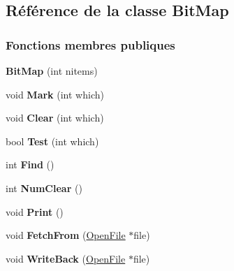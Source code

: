 \hypertarget{class_bit_map}{}\subsection{Référence de la classe Bit\+Map}
\label{class_bit_map}
\subsubsection*{Fonctions membres publiques}
\begin{DoxyCompactItemize}
\item 
\hypertarget{class_bit_map_a957cdc72d04ce006b2efce59caa90379}{}\label{class_bit_map_a957cdc72d04ce006b2efce59caa90379} 
{\bfseries Bit\+Map} (int nitems)
\item 
\hypertarget{class_bit_map_ae3eb006c755440ae830bf220457dbbc7}{}\label{class_bit_map_ae3eb006c755440ae830bf220457dbbc7} 
void {\bfseries Mark} (int which)
\item 
\hypertarget{class_bit_map_aee4445b4d2079c96f5c87896717569d2}{}\label{class_bit_map_aee4445b4d2079c96f5c87896717569d2} 
void {\bfseries Clear} (int which)
\item 
\hypertarget{class_bit_map_af5a945ba7b79e92a5a1bb0db24ecf26a}{}\label{class_bit_map_af5a945ba7b79e92a5a1bb0db24ecf26a} 
bool {\bfseries Test} (int which)
\item 
\hypertarget{class_bit_map_a031ad924663dcae2359403b3a76a9dd8}{}\label{class_bit_map_a031ad924663dcae2359403b3a76a9dd8} 
int {\bfseries Find} ()
\item 
\hypertarget{class_bit_map_af73514736aff03229d58557d0423daca}{}\label{class_bit_map_af73514736aff03229d58557d0423daca} 
int {\bfseries Num\+Clear} ()
\item 
\hypertarget{class_bit_map_a04d9c800f2a3b815f47d22c149ceae01}{}\label{class_bit_map_a04d9c800f2a3b815f47d22c149ceae01} 
void {\bfseries Print} ()
\item 
\hypertarget{class_bit_map_ad6d12eefec9b64e903d072c83f7c29a2}{}\label{class_bit_map_ad6d12eefec9b64e903d072c83f7c29a2} 
void {\bfseries Fetch\+From} (\hyperlink{class_open_file}{Open\+File} $\ast$file)
\item 
\hypertarget{class_bit_map_a19052d41ba5a654c7e478582dffba20d}{}\label{class_bit_map_a19052d41ba5a654c7e478582dffba20d} 
void {\bfseries Write\+Back} (\hyperlink{class_open_file}{Open\+File} $\ast$file)
\end{DoxyCompactItemize}
